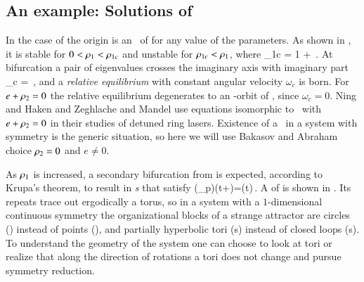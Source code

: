 
\subsection{\label{s:CLEsols} An example: Solutions of \cLe}

In the case of {\cLe}  the origin  is an \eqv\ of
 for any value of the parameters. As shown in
, it is stable for $0<\rho_1<\rho_{1c}$
and unstable for $\rho_{1c}<\rho_1$, where
\beq
	\rho_{1c} = 1 + \,.
\eeq
At bifurcation a pair of eigenvalues crosses the imaginary
axis with imaginary part
\beq
	\omega_c = 
\,,
	\label{eq:omegaCLE}
\eeq
and a \emph{relative equilibrium}  with 
constant angular velocity $\omega_c$ is born. For
$e+\rho_2=0$ the relative equilibrium degenerates to an
-orbit of \eqva{}, since $\omega_c =0$.
Ning and Haken and Zeghlache and
Mandel use equations isomorphic to \cLe\ with
$e+\rho_2=0$ in their studies of detuned ring lasers.
Existence of a \reqv\ in a system with  symmetry is
the generic situation, so here we will use Bakasov and
Abraham choice $\rho_2=0$ and $e \neq
0$.

As $\rho_1$ is increased,  a secondary bifurcation from
 is expected, according to Krupa's
theorem, to result in \emph{\rpo s} that satisfy
\beq
    \LieEl(\gSpace_p)\ssp(t+)=\ssp(t)\,.
\eeq
A {\rpo} of {\cLe} is shown in . Its repeats
trace out ergodically a torus, so in a system with a
$1$-dimensional continuous symmetry the organizational blocks
of a strange attractor are circles (\reqva) instead of points
(\eqva), and partially hyperbolic tori (\rpo s) instead of
closed loops (\po s). To understand the geometry of the
system one can choose to look at tori or realize that along
the direction of rotations a tori does not change and pursue
symmetry reduction.


